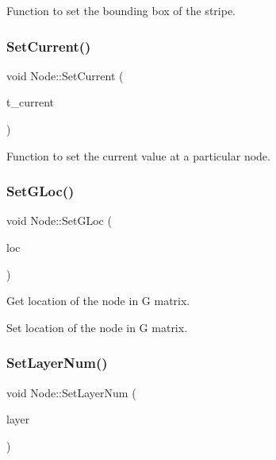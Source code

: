 Function to set the bounding box of the stripe. 

\mbox{\label{classNode_a359b49b9f2790426c97be364f76ce9a2}} 
\subsubsection{\texorpdfstring{Set\+Current()}{SetCurrent()}}
{\footnotesize\ttfamily void Node\+::\+Set\+Current (\begin{DoxyParamCaption}\item[{double}]{t\+\_\+current }\end{DoxyParamCaption})}



Function to set the current value at a particular node. 

\mbox{\label{classNode_a28572563d5947aa39b51b4c0f848e432}} 
\subsubsection{\texorpdfstring{Set\+G\+Loc()}{SetGLoc()}}
{\footnotesize\ttfamily void Node\+::\+Set\+G\+Loc (\begin{DoxyParamCaption}\item[{\hyperlink{node_8h_a5b622fe4354316a2f349615d150ae998}{Node\+Idx}}]{loc }\end{DoxyParamCaption})}



Get location of the node in G matrix. 

Set location of the node in G matrix. \mbox{\label{classNode_a9ae3dca8ba172157836ca70eede370c5}} 
\subsubsection{\texorpdfstring{Set\+Layer\+Num()}{SetLayerNum()}}
{\footnotesize\ttfamily void Node\+::\+Set\+Layer\+Num (\begin{DoxyParamCaption}\item[{int}]{layer }\end{DoxyParamCaption})}



